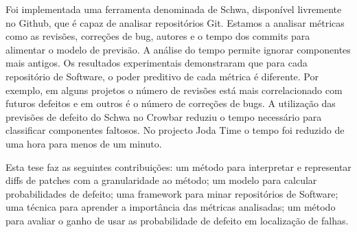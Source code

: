 Foi implementada uma ferramenta denominada de Schwa, disponível livremente no Github, que é capaz de analisar repositórios Git. Estamos a analisar métricas como as revisões, correções de bug, autores e o tempo dos commits para alimentar o modelo de previsão. A análise do tempo permite ignorar componentes mais antigos. Os resultados experimentais demonstraram  que para cada repositório de Software, o poder preditivo de cada métrica é diferente. Por exemplo, em alguns projetos o número de revisões está mais correlacionado com futuros defeitos e em outros é o número de correções de bugs. A utilização das previsões de defeito do Schwa no Crowbar reduziu o tempo necessário para classificar componentes faltosos. No projecto Joda Time o tempo foi reduzido de uma hora para menos de um minuto.

Esta tese faz as seguintes contribuições: um método para interpretar e representar diffs de patches com a granularidade ao método; um modelo para calcular probabilidades de defeito; uma framework para minar repositórios de Software; uma técnica para aprender a importância das métricas analisadas; um método para avaliar o ganho de usar as probabilidade de defeito em localização de falhas.